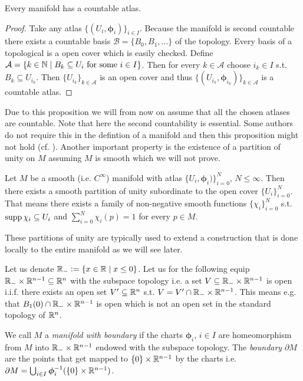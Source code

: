 \documentclass[../main.tex]{subfiles}
\begin{document}
\begin{proposition}
    Every manifold has a countable atlas. 
\end{proposition}
\begin{proof}
    Take any atlas $\{(U_i, \boldsymbol{\phi}_i) \}_{i \in I}$. Because the manifold is 
    second countable there exists a countable basis
    $\mathcal{B} = \{ B_0, B_1, ... \}$ of the topology. Every basis of a topological is 
    a open cover which is easily checked. Define 
    $\mathcal{A} = \{ k \in \mathbb{N} \mid B_k \subseteq U_i \text{ for some 
    $i \in I$} \}$. Then for every $k \in \mathcal{A}$ choose 
    $i_k \in I$ s.t. $B_k \subseteq U_{i_k}$. Then $\{U_{i_k}\}_{k\in \mathcal{A}}$ 
    is an open cover and thus $\{ (U_{i_k}, \boldsymbol{\phi}_{i_k}) \}_{k \in \mathcal{A}}$
    is a countable atlas.
\end{proof}
Due to this proposition we will from now on assume that all the chosen atlases
are countable.
Note that here the second countability is essential. Some authors do not 
require this in the defintion of a manifold and then this proposition might not hold 
(cf. \cite[1.A.2]{gallot_hulin_lafontaine}).
Another important property is the existence of a partition of unity on $M$ 
assuming $M$ is smooth which we will not prove.

\begin{theorem}
    Let $M$ be a smooth (i.e. $C^\infty$) manifold with atlas 
    $\{U_i, \boldsymbol{\phi}_i)\}_{i=0}^N$, $N \leq \infty$. Then there exists a smooth
    partition of unity subordinate to the open cover $\{U_i\}_{i=0}^N$.
    That means there exists a family of non-negative smooth functions $\{ \chi_i \}_{i=0}^N$
    s.t. $\operatorname{supp} \chi_i \subseteq U_i$ and $\sum_{i=0}^N \chi_i(p) = 1$ 
    for every $p \in M$.
\end{theorem}
These partitions of unity are typically used to extend a construction that 
is done locally to the entire manifold as we will see later.

Let us denote $\mathbb{R}_- \vcentcolon= \{ x \in \mathbb{R} \mid x \leq 0 \}$. 
Let us for the following equip $\mathbb{R}_- \times \mathbb{R}^{n-1} \subseteq \mathbb{R}^n$ with the 
subspace topology i.e. a set $V \subseteq \mathbb{R}_- \times \mathbb{R}^{n-1}$ is
open i.i.f. there exists an open set $V' \subseteq \mathbb{R}^n$ s.t. 
$V = V' \cap \mathbb{R}_- \times \mathbb{R}^{n-1}$. This means e.g. that 
$B_1(0) \cap \mathbb{R}_- \times \mathbb{R}^{n-1}$ is open which is not an open set 
in the standard topology of $\mathbb{R}^n$.
\begin{definition}\label{def:manifold_with_boundary}
    We call $M$ a \textit{manifold with boundary} if the charts $\boldsymbol{\phi}_i$, 
    $i\in I$ are homeomorphism from $M$ into $\mathbb{R}_- \times \mathbb{R}^{n-1}$ 
    endowed with the subspace topology. The \textit{boundary} 
    $\partial M$ are the points that get mapped to $\{0\} \times \mathbb{R}^{n-1}$ 
    by the charts i.e. $\partial M = \bigcup_{i\in I} \boldsymbol{\phi}_i^{-1}(\{0\} \times \mathbb{R}^{n-1})$.
\end{definition}
\end{document}
